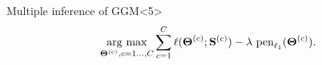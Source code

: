 \begin{frame}
\begin{overlayarea}{\textwidth}{\textheight}

  \begin{block}{Multiple inference of GGM}<5>
    \begin{equation*}
      \argmax_{\boldsymbol\Theta^{(c)}, c=1\dots,C} 
      \sum_{c=1}^C
      \ell( \boldsymbol\Theta^{(c)};
      \mathbf{S}^{(c)}) -
      \lambda \ \mathrm{pen}_{\ell_1}(\boldsymbol\Theta^{(c)}).
    \end{equation*}
  \end{block}

\end{overlayarea}

\end{frame}

